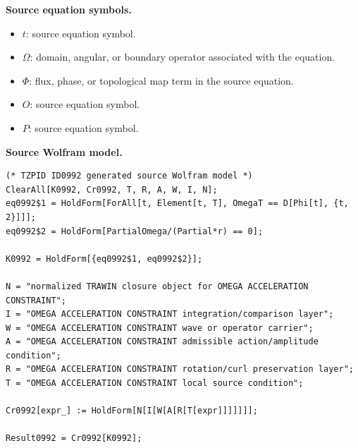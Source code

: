 \begin{minipage}[t]{0.49\linewidth}
\begingroup
\small
\raggedright
\textbf{Source equation symbols.}\par
\begin{itemize}[leftmargin=1.35em,itemsep=1pt,topsep=1pt,parsep=0pt]
    \item $t$: source equation symbol.
    \item $\Omega$: domain, angular, or boundary operator associated with the equation.
    \item $\Phi$: flux, phase, or topological map term in the source equation.
    \item $O$: source equation symbol.
    \item $P$: source equation symbol.
\end{itemize}
\endgroup
\end{minipage}\hfill
\begin{minipage}[t]{0.47\linewidth}
\begingroup
\scriptsize
\raggedright
\textbf{Source Wolfram model.}\par
\begin{Verbatim}[fontsize=\tiny,breaklines=true,breakanywhere=true]
(* TZPID ID0992 generated source Wolfram model *)
ClearAll[K0992, Cr0992, T, R, A, W, I, N];
eq0992$1 = HoldForm[ForAll[t, Element[t, T], OmegaT == D[Phi[t], {t, 2}]]];
eq0992$2 = HoldForm[PartialOmega/(Partial*r) == 0];

K0992 = HoldForm[{eq0992$1, eq0992$2}];

N = "normalized TRAWIN closure object for OMEGA ACCELERATION CONSTRAINT";
I = "OMEGA ACCELERATION CONSTRAINT integration/comparison layer";
W = "OMEGA ACCELERATION CONSTRAINT wave or operator carrier";
A = "OMEGA ACCELERATION CONSTRAINT admissible action/amplitude condition";
R = "OMEGA ACCELERATION CONSTRAINT rotation/curl preservation layer";
T = "OMEGA ACCELERATION CONSTRAINT local source condition";

Cr0992[expr_] := HoldForm[N[I[W[A[R[T[expr]]]]]]];

Result0992 = Cr0992[K0992];
\end{Verbatim}
\endgroup
\end{minipage}

